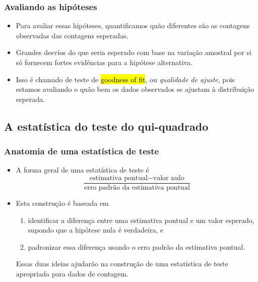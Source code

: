 
\begin{frame}
\frametitle{Avaliando as hipóteses}

\begin{itemize}
\justifying
\item Para avaliar essas hipóteses, quantificamos quão diferentes são as contagens observadas das contagens esperadas.

\pause
\justifying
\item Grandes desvios do que seria esperado com base na variação amostral por si só fornecem fortes evidências para a hipótese alternativa.

\pause
\justifying
\item Isso é chamado de teste de \hl{goodness of fit}, ou \textit{qualidade de ajuste}, pois estamos avaliando o quão bem os dados observados se ajustam à distribuição esperada.

\end{itemize}

\end{frame}


\subsection{A estatística do teste do qui-quadrado}


\begin{frame}
\frametitle{Anatomia de uma estatística de teste}

\begin{itemize}
\justifying
\item A forma geral de uma estatística de teste é
\[ \frac{\text{estimativa pontual} - \text{valor nulo}}{\text{erro padrão da estimativa pontual}} \]

\pause
\justifying
\item Esta construção é baseada em 
\begin{enumerate}
\justifying
\item identificar a diferença entre uma estimativa pontual e um valor esperado, supondo que a hipótese nula é verdadeira, e
\justifying
\item padronizar essa diferença usando o erro padrão da estimativa pontual. 
\end{enumerate}
\pause
\justifying
Essas duas ideias ajudarão na construção de uma estatística de teste apropriada para dados de contagem.

\end{itemize}

\end{frame}


